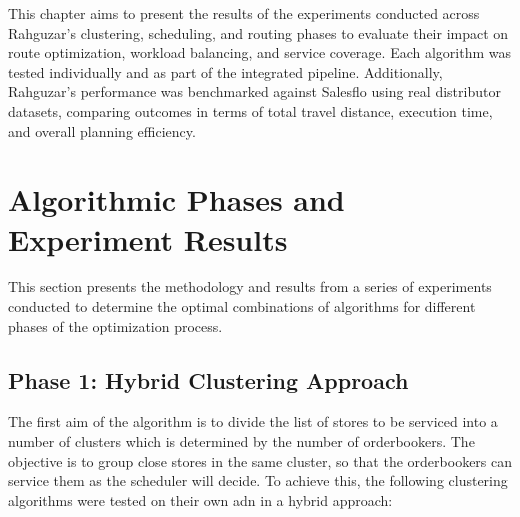 This chapter aims to present the results of the experiments conducted across Rahguzar’s clustering, scheduling, and routing phases to evaluate their impact on route optimization, workload balancing, and service coverage. Each algorithm was tested individually and as part of the integrated pipeline. Additionally, Rahguzar’s performance was benchmarked against Salesflo using real distributor datasets, comparing outcomes in terms of total travel distance, execution time, and overall planning efficiency.

\section{Algorithmic Phases and Experiment Results}

This section presents the methodology and results from a series of experiments conducted to determine the optimal combinations of algorithms for different phases of the optimization process.




\subsection{Phase 1: Hybrid Clustering Approach}
The first aim of the algorithm is to divide the list of stores to be serviced into a number of clusters which is determined by the number of orderbookers.
The objective is to group close stores in the same cluster, so that the orderbookers can service them as the scheduler will decide.
To achieve this, the following clustering algorithms were tested on their own adn in a hybrid approach:



